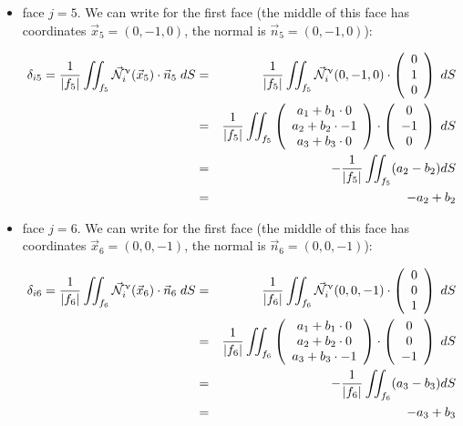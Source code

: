 \begin{itemize}
\item face $j=5$. We can write for the first face (the middle of this face has coordinates 
$\vec{x}_5=(0,-1,0)$, the normal is $\vec{n}_5=(0,-1,0)$):

\begin{eqnarray}
\delta_{i5}=
\frac{1}{|f_5|} \iint_{f_5}
\vec{{\mathcal{N}}}^\upnu_i( \vec{x}_5) \cdot \vec{n}_5 \; dS
&=&\frac{1}{|f_5|} \iint_{f_5} \vec{{\mathcal{N}}}^\upnu_i( 0,-1,0) \cdot 
\left(\begin{array}{c} 0 \\ 1  \\ 0\end{array}\right) \; dS \nonumber\\
&=& \frac{1}{|f_5|} \iint_{f_5} 
\left(\begin{array}{c} a_1+b_1\cdot 0 \\ a_2 + b_2 \cdot -1 \\ a_3 + b_3\cdot 0 \end{array}\right)
\cdot \left(\begin{array}{c} 0 \\ -1 \\ 0 \end{array}\right) \; dS \nonumber\\
&=& -\frac{1}{|f_5|} \iint_{f_5} (a_2-b_2) dS \nonumber\\
&=& -a_2+b_2
\end{eqnarray}


\item face $j=6$. We can write for the first face (the middle of this face has coordinates 
$\vec{x}_6=(0,0,-1)$, the normal is $\vec{n}_6=(0,0,-1)$):


\begin{eqnarray}
\delta_{i6}=
\frac{1}{|f_6|} \iint_{f_6}
\vec{{\mathcal{N}}}^\upnu_i( \vec{x}_6) \cdot \vec{n}_6 \; dS
&=&\frac{1}{|f_6|} \iint_{f_6} \vec{{\mathcal{N}}}^\upnu_i( 0,0,-1) \cdot 
\left(\begin{array}{c} 0 \\ 0  \\ 1\end{array}\right) \; dS \nonumber\\
&=& \frac{1}{|f_6|} \iint_{f_6} 
\left(\begin{array}{c} a_1+b_1\cdot 0 \\ a_2 + b_2 \cdot 0 \\ a_3 + b_3\cdot -1 \end{array}\right)
\cdot \left(\begin{array}{c} 0 \\ 0 \\ -1 \end{array}\right) \; dS \nonumber\\
&=& -\frac{1}{|f_6|} \iint_{f_6} (a_3-b_3) dS \nonumber\\
&=& -a_3+b_3
\end{eqnarray}

\end{itemize}


